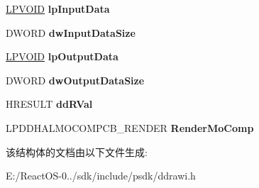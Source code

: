 \begin{DoxyCompactItemize}
\hyperlink{interfacevoid}{L\+P\+V\+O\+ID} {\bfseries lp\+Input\+Data}
\item 
\mbox{\label{struct___d_d_h_a_l___r_e_n_d_e_r_m_o_c_o_m_p_d_a_t_a_a272f2220e5add5875ad774da5e65f1fb}} 
D\+W\+O\+RD {\bfseries dw\+Input\+Data\+Size}
\item 
\mbox{\label{struct___d_d_h_a_l___r_e_n_d_e_r_m_o_c_o_m_p_d_a_t_a_a9a5950f9adc5814d1ff99344196bd51f}} 
\hyperlink{interfacevoid}{L\+P\+V\+O\+ID} {\bfseries lp\+Output\+Data}
\item 
\mbox{\label{struct___d_d_h_a_l___r_e_n_d_e_r_m_o_c_o_m_p_d_a_t_a_a3f720cf3434b7b306410f041408e6241}} 
D\+W\+O\+RD {\bfseries dw\+Output\+Data\+Size}
\item 
\mbox{\label{struct___d_d_h_a_l___r_e_n_d_e_r_m_o_c_o_m_p_d_a_t_a_a8e502cc26a19d29b8bb661dc70bc12e9}} 
H\+R\+E\+S\+U\+LT {\bfseries dd\+R\+Val}
\item 
\mbox{\label{struct___d_d_h_a_l___r_e_n_d_e_r_m_o_c_o_m_p_d_a_t_a_aba63a4cd1d77a08246e1adf07dcc5867}} 
L\+P\+D\+D\+H\+A\+L\+M\+O\+C\+O\+M\+P\+C\+B\+\_\+\+R\+E\+N\+D\+ER {\bfseries Render\+Mo\+Comp}
\end{DoxyCompactItemize}


该结构体的文档由以下文件生成\+:\begin{DoxyCompactItemize}
\item 
E\+:/\+React\+O\+S-\/0../sdk/include/psdk/ddrawi.\+h\end{DoxyCompactItemize}
